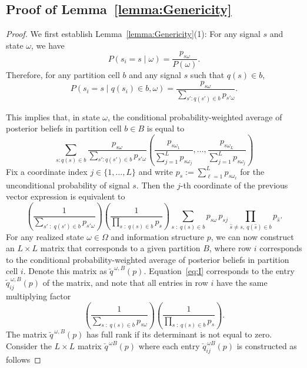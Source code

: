 \documentclass[12pt,reqno]{amsart}
\begin{document}
\subsection{Proof of Lemma~\ref{lemma:Genericity}}\label{app:proofGenericity}
\begin{proof} We first establish Lemma~\ref{lemma:Genericity}(1):
For any signal $s$ and state $\omega$, we have
\[
P(s_i=s\mid\omega)
=\frac{p_{s\omega}}{P(\omega)}.
\]
Therefore, for any partition cell $b$ and any signal $s$ such that $q(s)\in b$,
\[
P(s_i=s\mid q(s_i)\in b,\omega)
=\frac{p_{s\omega}}
{\displaystyle\sum_{s':q(s')\in b}p_{s'\omega}}.
\]

This implies that, in state $\omega$, the conditional probability-weighted average of posterior beliefs in partition cell $b \in B$ is equal to
\begin{equation*}
    \sum_{s:q(s) \in b}\frac{p_{s\omega}}{\displaystyle \sum_{s':q(s')\in b}p_{s'\omega}}\left( \frac{p_{s\omega_1}}{\sum_{j=1}^Lp_{s\omega_j}},\ldots, \frac{p_{s\omega_L}}{\sum_{j=1}^Lp_{s\omega_j}}\right)
\end{equation*}
Fix a coordinate index $j\in\{1,\ldots,L\}$ and write $p_s:=\sum_{\ell=1}^L p_{s\omega_\ell}$ for the unconditional probability of signal $s$. Then the $j$-th coordinate of the previous vector expression is equivalent to
\begin{equation}\label{eq:I}
  \left(
    \frac{1}{\displaystyle \sum_{s'\;:\; q(s')\in b} p_{s'\omega}}
  \right)
  \left(
    \frac{1}{\displaystyle \prod_{s\;:\; q(s)\in b} p_s}
  \right)
  \sum_{s\;:\; q(s)\in b}
  p_{s\omega}\, p_{sj}\!
  \prod_{\hat{s}\neq s,\ q(\hat{s})\in b} p_{\hat{s}}.
  \tag{I}
\end{equation}
\noindent
For any realized state $\omega\in\Omega$ and information structure $p$, we can now construct an
$L\times L$ matrix that corresponds to a given partition $B$, where row $i$ corresponds to the
conditional probability-weighted average of posterior beliefs in partition cell $i$. Denote this matrix as
$\tilde q^{\,\omega,B}(p)$. Equation~\eqref{eq:I} corresponds to the entry
$\tilde q^{\,\omega,B}_{ij}(p)$ of the matrix, and note that all entries in row $i$ have the same
multiplying factor
\[
  \left(
    \frac{1}{\displaystyle \sum_{s\;:\; q(s)\in b} p_{s\omega}}
  \right)
  \left(\frac{1}{\displaystyle \prod_{s\;:\; q(s)\in b} p_s}
  \right).
\]
The matrix $\tilde q^{\,\omega,B}(p)$ has full rank if its determinant is not equal to zero.
Consider the $L\times L$ matrix $\check q^{\,\omega B}(p)$ where each entry $\check q^{\,\omega B}_{ij}(p)$ is constructed as follows

\end{proof}
\end{document}
